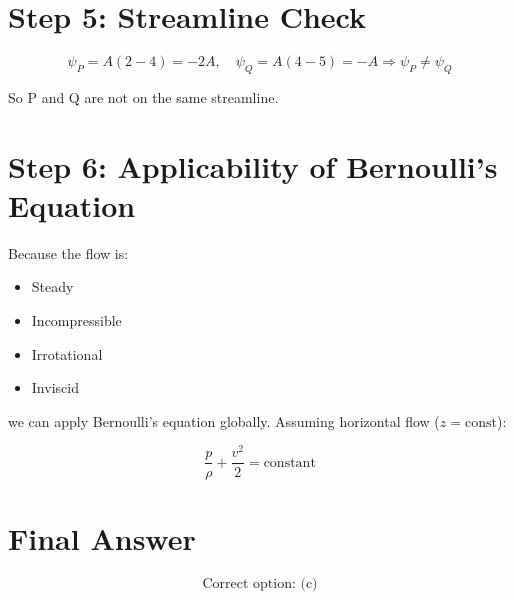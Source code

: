 \documentclass[12pt]{article}
\begin{document}
\section*{Step 5: Streamline Check}

\[
\psi_P = A(2 - 4) = -2A, \quad \psi_Q = A(4 - 5) = -A
\Rightarrow \psi_P \neq \psi_Q
\]

So P and Q are not on the same streamline.

\section*{Step 6: Applicability of Bernoulli's Equation}

Because the flow is:

\begin{itemize}
\item Steady
\item Incompressible
\item Irrotational
\item Inviscid
\end{itemize}

we can apply Bernoulli's equation globally. Assuming horizontal flow (\(z = \text{const}\)):

\[
\frac{p}{\rho} + \frac{v^2}{2} = \text{constant}
\]

\section*{Final Answer}

\[
\boxed{\text{Correct option: (c)}}
\]
\end{document}
